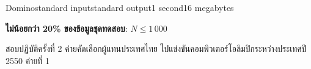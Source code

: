 \documentclass[11pt,a4paper]{article}
\begin{document}
\begin{problem}{Domino}{standard input}{standard output}{1 second}{16 megabytes}
\Examples

\begin{example}
%
\end{example}

\Scoring

\textbf{ไม่น้อยกว่า 20\% ของข้อมูลชุดทดสอบ}: $N \leq 1\,000$

\Source

สอบปฏิบัติครั้งที่ 2 ค่ายคัดเลือกผู้แทนประเทศไทย ไปแข่งขันคอมพิวเตอร์โอลิมปิกระหว่างประเทศปี 2550 ค่ายที่ 1

\end{problem}
\end{document}
